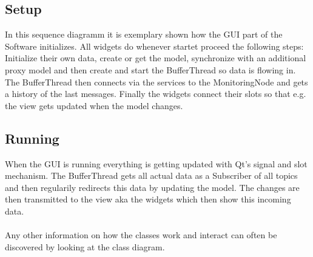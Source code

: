 \subsection*{Setup}
In this sequence diagramm it is exemplary shown how the GUI part of the Software initializes.
All widgets do whenever startet proceed the following steps: Initialize their own data, create or get the model, synchronize with an additional proxy model and then create and start the BufferThread so data is flowing in. The BufferThread then connects via the services to the MonitoringNode and gets a history of the last messages.
Finally the widgets connect their slots so that e.g. the view gets updated when the model changes.

\subsection*{Running}
When the GUI is running everything is getting updated with Qt's signal and slot mechanism. The BufferThread gets all actual data as a Subscriber of all topics and then regularily redirects this data by updating the model. The changes are then transmitted to the view aka the widgets which then show this incoming data.
\\
\\Any other information on how the classes work and interact can often be discovered by looking at the class diagram.